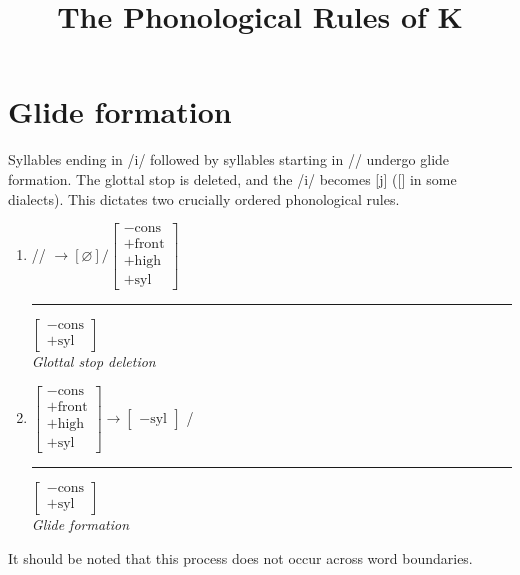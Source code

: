 \documentclass[12pt]{article}
\let\emptyset\varnothing
\newcommand{\M}{\textturnmrleg} %
\newcommand{\glot}{\textipa{P}}
\newcommand{\0}{$\emptyset$} %
\newcommand{\kurango}{K\textipa{uRaNO}}
\begin{document}
\title{The Phonological Rules of \kurango}
\maketitle

\section{Glide formation}
Syllables ending in /i/ followed by syllables starting in /\glot/ undergo glide formation. The glottal stop is deleted, and the /i/ becomes [j] ([\M] in some dialects). This dictates two crucially ordered phonological rules.
	
	\begin{enumerate}
	\centering
		\item %
			 /\glot/ $\longrightarrow [\emptyset] 
			 /
			 \left[\begin{array}{l} -\text{cons}\\+\text{front}\\+\text{high}\\+\text{syl} \end{array}\right]$ \rule[-10pt]{20pt}{1pt} $\left[\begin{array}{l} -\text{cons}\\+\text{syl} \end{array}\right]$ \\ \emph{Glottal stop deletion}
		\item %
			$\left[\begin{array}{l} -\text{cons}\\+\text{front}\\+\text{high}\\+\text{syl} \end{array}\right] \longrightarrow \left[\begin{array}{l} -\text{syl} \end{array}\right]$ / \rule[-10pt]{20pt}{1pt} $\left[\begin{array}{l} -\text{cons}\\+\text{syl} \end{array}\right]$ \\ \emph{Glide formation}
 	\end{enumerate}

 It should be noted that this process does not occur across word boundaries.
\end{document}
